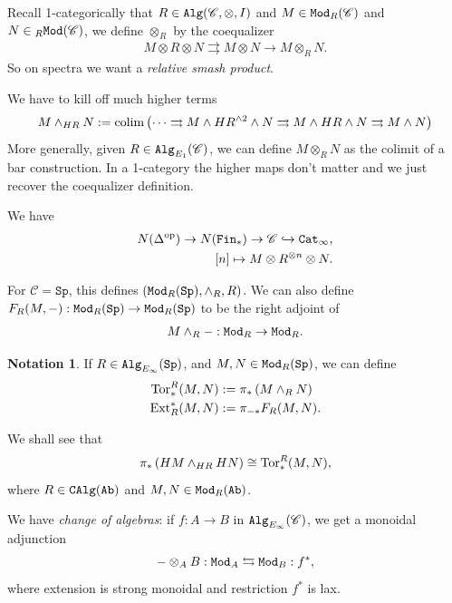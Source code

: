 \documentclass[12pt]{amsart}
\theoremstyle{definition}
\newtheorem{notation}[theorem]{Notation}
\let\smashprod\wedge
\providecommand{\Sp}{\texttt{Sp}}
\providecommand{\Sp}{\text{Sp}}
\begin{document}
Recall 1-categorically that $R\in \texttt{Alg}(\mathscr{C},\otimes,I)$ and $M\in\texttt{Mod}_R(\mathscr{C})$ and $N \in {}_R\texttt{Mod}(\mathscr{C})$, we define $\otimes_R$ by the coequalizer
\begin{align*}
    M \otimes R \otimes N \rightrightarrows M \otimes N \to M \otimes_R N.
\end{align*}
So on spectra we want a \textit{relative smash product}.

We have to kill off much higher terms
\begin{align*}
    M \smashprod_{HR} N := \colim \left( \cdots \rightrightarrows M \smashprod HR^{\smashprod 2} \smashprod N  \rightrightarrows M \smashprod HR \smashprod N \rightrightarrows M \smashprod N\right)
\end{align*}
More generally, given $R \in \texttt{Alg}_{E_1}(\mathscr{C})$, we can define $M \otimes_R N$ as the colimit of a bar construction. In a 1-category the higher maps don't matter and we just recover the coequalizer definition.

We have
\begin{align*}
    N(\Delta^{\text{op}}) \to N(\texttt{Fin}_\ast) \to \mathscr{C} \xhookrightarrow{} \texttt{Cat}_\infty, \\
    [n] \mapsto M \otimes R^{\otimes n} \otimes N.
\end{align*}

For $\mathscr{C} = \Sp$, this defines $\left( \Mod_R(\Sp), \smashprod_R, R \right)$. We can also define $F_R(M,-): \Mod_R(\Sp) \to \Mod_R(\Sp)$ to be the right adjoint of
\begin{align*}
    M \smashprod_R - : \Mod_R \to \Mod_R.
\end{align*}

\begin{notation} If $R\in \Alg_{E_\infty}(\Sp)$, and $M,N\in \Mod_R(\Sp)$, we can define
\begin{align*}
    \Tor_\ast^R(M,N) &:= \pi_\ast \left( M \smashprod_R N \right) \\
    \Ext_R^\ast(M,N) &:= \pi_{- \ast} F_R(M,N).
\end{align*}
\end{notation}

We shall see that
\begin{align*}
    \pi_\ast \left( HM \smashprod_{HR} HN \right) \cong \Tor_\ast^R(M,N),
\end{align*}
where $R\in \texttt{CAlg}(\texttt{Ab})$ and $M,N\in \texttt{Mod}_R(\texttt{Ab})$.

We have \textit{change of algebras}: if $f: A \to B$ in $\texttt{Alg}_{E_\infty}(\mathscr{C})$, we get a monoidal adjunction
\begin{align*}
    - \otimes_A B : \texttt{Mod}_A \leftrightarrows \texttt{Mod}_B : f^\ast,
\end{align*}
where extension is strong monoidal and restriction $f^\ast$ is lax.
\end{document}
